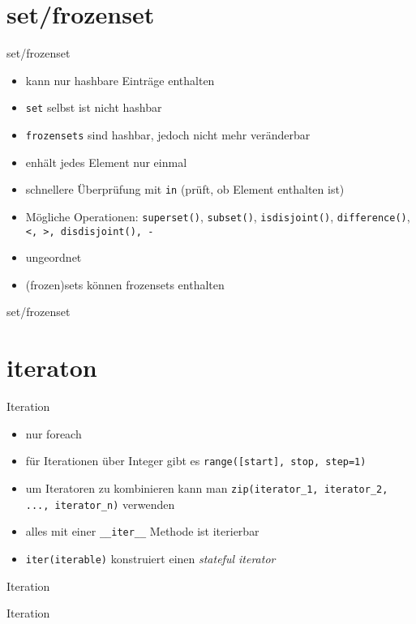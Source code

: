 \section{set/frozenset}
\begin{frame}{set/frozenset}
\begin{itemize}
	\item kann nur hashbare Einträge enthalten
	\item \texttt{set} selbst ist nicht hashbar
	\item \texttt{frozensets} sind hashbar, jedoch nicht mehr veränderbar
	\item enhält jedes Element nur einmal
	\item schnellere Überprüfung mit \texttt{in} (prüft, ob Element enthalten ist)
	\item Mögliche Operationen: \texttt{superset()}, \texttt{subset()}, \texttt{isdisjoint()}, \texttt{difference()}, \texttt{<, >, disdisjoint(), -}
	\item ungeordnet
	\item (frozen)sets können frozensets enthalten
\end{itemize}
\end{frame}
\begin{frame}{set/frozenset}
	
\end{frame}

\section{iteraton}
\begin{frame}{Iteration}
\begin{itemize}
	\item nur foreach
	\item für Iterationen über Integer gibt es \texttt{range([start], stop, step=1)}
	\item um Iteratoren zu kombinieren kann man \texttt{zip(iterator_1, iterator_2, ..., iterator_n)} verwenden
	\item alles mit einer \texttt{__iter__} Methode ist iterierbar
	\item \texttt{iter(iterable)} konstruiert einen \textit{stateful iterator}
\end{itemize}
\end{frame}
\begin{frame}{Iteration}
	
\end{frame}
\begin{frame}{Iteration}
	
\end{frame}

